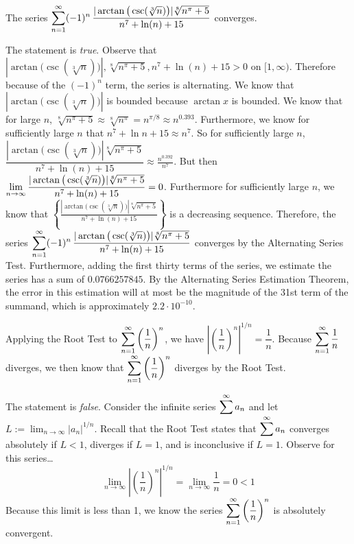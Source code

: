 \documentclass[11pt,letterpaper]{article}
\begin{document}
 The series $\displaystyle\sum_{n=1}^\infty (-1)^n \, \dfrac{|\arctan \big( \csc(\sqrt[3]{n} ) \big)| \sqrt[8]{n^\pi + 5}}{n^7 + \ln(n) + 15}$ converges. \pspace

\sol The statement is \textit{true}. Observe that $|\arctan \big( \csc(\sqrt[3]{n} ) \big)|, \sqrt[8]{n^\pi + 5}, n^7 + \ln(n) + 15 > 0$ on $[1, \infty)$. Therefore because of the $(-1)^n$ term, the series is alternating. We know that $|\arctan \big( \csc(\sqrt[3]{n} ) \big)|$ is bounded because $\arctan x$ is bounded. We know that for large $n$, $\sqrt[8]{n^\pi + 5} \approx \sqrt[8]{n^\pi}= n^{\pi/8} \approx n^{0.393}$. Furthermore, we know for sufficiently large $n$ that $n^7 + \ln n + 15 \approx n^7$. So for sufficiently large $n$, $\dfrac{|\arctan \big( \csc(\sqrt[3]{n} ) \big)| \sqrt[8]{n^\pi + 5}}{n^7 + \ln(n) + 15} \approx \frac{n^{0.392}}{n^7}$. But then $\displaystyle\lim_{n \to \infty} \frac{|\arctan \big( \csc(\sqrt[3]{n} ) \big)| \sqrt[8]{n^\pi + 5}}{n^7 + \ln(n) + 15}= 0$. Furthermore for sufficiently large $n$, we know that $\left\{ \frac{|\arctan \big( \csc(\sqrt[3]{n} ) \big)| \sqrt[8]{n^\pi + 5}}{n^7 + \ln(n) + 15} \right\}$ is a decreasing sequence. Therefore, the series $\displaystyle\sum_{n=1}^\infty (-1)^n \, \dfrac{|\arctan \big( \csc(\sqrt[3]{n} ) \big)| \sqrt[8]{n^\pi + 5}}{n^7 + \ln(n) + 15}$ converges by the Alternating Series Test. Furthermore, adding the first thirty terms of the series, we estimate the series has a sum of $0.0766257845$. By the Alternating Series Estimation Theorem, the error in this estimation will at most be the magnitude of the 31st term of the summand, which is approximately $2.2 \cdot 10^{-10}$. \pvspace{1.3cm}



 Applying the Root Test to $\displaystyle\sum_{n=1}^\infty \left( \dfrac{1}{n} \right)^n$, we have $\left| \left( \dfrac{1}{n} \right)^n \right|^{1/n}= \dfrac{1}{n}$. Because $\displaystyle\sum_{n=1}^\infty \dfrac{1}{n}$ diverges, we then know that $\displaystyle\sum_{n=1}^\infty \left( \dfrac{1}{n} \right)^n$ diverges by the Root Test. \pspace

\sol The statement is \textit{false}. Consider the infinite series $\displaystyle\sum^\infty a_n$ and let $L:= \lim_{n \to \infty} |a_n|^{1/n}$. Recall that the Root Test states that $\displaystyle\sum^\infty a_n$ converges absolutely if $L < 1$, diverges if $L= 1$, and is inconclusive if $L= 1$. Observe for this series\dots
	\[
	\lim_{n \to \infty} \left| \left( \dfrac{1}{n} \right)^n \right|^{1/n}= \lim_{n \to \infty} \dfrac{1}{n}= 0 < 1
	\]
Because this limit is less than 1, we know the series $\displaystyle\sum_{n=1}^\infty \left( \dfrac{1}{n} \right)^n$ is absolutely convergent. \pvspace{1.3cm}
\end{document}
